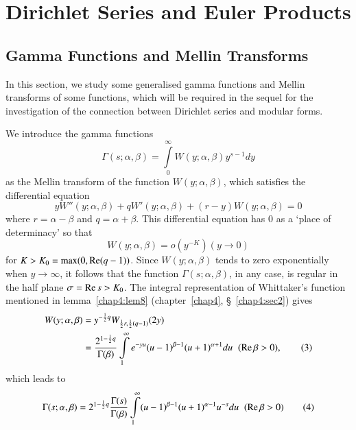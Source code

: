 \chapter{Dirichlet Series and Euler Products}\label{chap5}

\section{Gamma Functions and Mellin Transforms}\label{chap5:sec1}\pageoriginale

In this section, we study some generalised gamma functions and Mellin
transforms of some functions, which will be required in the sequel for
the investigation of the connection between Dirichlet series and
modular forms.

We introduce the gamma functions
\begin{equation*}
\Gamma(s;\alpha, \beta) = \int\limits^{\infty}_0 W(y;\alpha,\beta)
y^{s-1} dy \tag{1}\label{c5:eq1:1}
\end{equation*}
as the Mellin transform of the function $W(y;\alpha,\beta)$, which
satisfies the differential equation
\begin{equation*}
y W''(y;\alpha,\beta) + q W'(y;\alpha,\beta) +
(r-y)W(y;\alpha,\beta)=0 \tag{2}\label{c5:eq1:2}
\end{equation*}
where $r=\alpha-\beta$ and $q=\alpha+\beta$. This differential
equation has 0 as a `place of determinacy' so that 
$$
W(y;\alpha,\beta) =o(y^{-K})(y\to 0)
$$
for $K>K_0=\max(0,\operatorname{Re}(q-1))$. Since $W(y;\alpha,\beta)$ tends to zero
exponentially when $y\to \infty$, it follows that the function
$\Gamma(s;\alpha,\beta)$, in any case, is regular in the half plane
$\sigma=\operatorname{Re} s>K_0$. The integral representation of Whittaker's
function mentioned in lemma~\ref{chap4:lem8} 
(chapter~\ref{chap4}, \S~\ref{chap4:sec2}) gives
\begin{align*}
W(y;\alpha,\beta)& =y^{-\frac{1}{2}q}
W_{\frac{1}{2}r,\frac{1}{2}(q-1)} (2y)\\
& = \frac{2^{1-\frac{1}{2}q}}{\Gamma(\beta)} \int\limits^{\infty}_1
  e^{-yu} (u-1)^{\beta-1} 
(u+1)^{\alpha+1} du \;\; (\operatorname{Re} \beta > 0), \tag{3}\label{c5:eq1:3}
\end{align*}
which \pageoriginale leads to 
\begin{equation*}
\Gamma(s;\alpha,\beta) = 2^{1-\frac{1}{2}q}
\frac{\Gamma(s)}{\Gamma(\beta)}\int\limits^{\infty}_1 (u-1)^{\beta-1}
(u+1)^{\alpha-1} u^{-s} du \;\; (\operatorname{Re} \beta >0) \tag{4}\label{c5:eq1:4}
\end{equation*}
